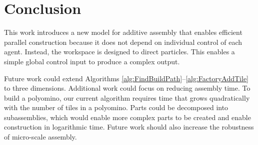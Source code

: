 
\section{Conclusion}\label{sec:Conclusion}

This work introduces a new model for additive assembly that enables efficient parallel construction because it does not depend on individual control of each agent.
Instead,   the workspace is designed  to direct particles. 
 This enables  a simple global control input to produce a complex output.

  
 
  

Future work could extend Algorithms \ref{alg:FindBuildPath}--\ref{alg:FactoryAddTile} to three dimensions. 
Additional work could focus on reducing assembly time. To build a polyomino, our current algorithm requires time that grows quadratically with the number of tiles in a polyomino.  
Parts could be decomposed into subassemblies, which would enable more complex parts to be created and enable construction in logarithmic time. Future work should also increase the robustness of micro-scale assembly.

    
